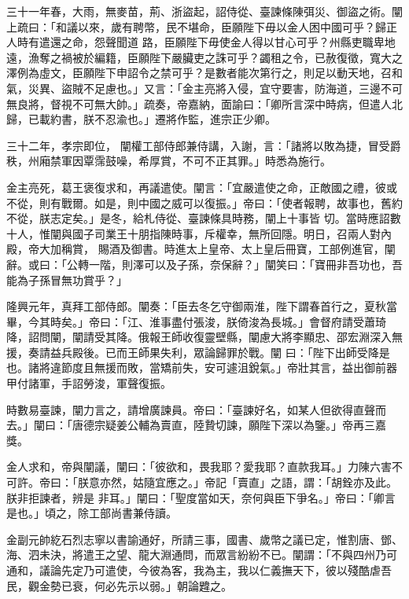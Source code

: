 \begin{pinyinscope}
 三十一年春，大雨，無麥苗，荊、浙盜起，詔侍從、臺諫條陳弭災、御盜之術。闡上疏曰：「和議以來，歲有聘幣，民不堪命，臣願陛下毋以金人困中國可乎？歸正人時有遣還之命，怨聲聞道
 路，臣願陛下毋使金人得以甘心可乎？州縣吏職卑地遠，漁奪之禍被於編籍，臣願陛下嚴臟吏之誅可乎？蠲租之令，已赦復徵，寬大之澤例為虛文，臣願陛下申詔令之禁可乎？是數者能次第行之，則足以動天地，召和氣，災異、盜賊不足慮也。」又言：「金主亮將入侵，宜守要害，防海道，三邊不可無良將，督視不可無大帥。」疏奏，帝嘉納，面諭曰：「卿所言深中時病，但遣人北歸，已載約書，朕不忍渝也。」遷將作監，進宗正少卿。



 三十二年，孝宗即位，
 闡權工部侍郎兼侍講，入謝，言：「諸將以敗為捷，冒受爵秩，州廂禁軍因覃霈鼓噪，希厚賞，不可不正其罪。」時悉為施行。


金主亮死，葛王褒復求和，再議遣使。闡言：「宜嚴遣使之命，正敵國之禮，彼或不從，則有戰爾。如是，則中國之威可以復振。」帝曰：「使者報聘，故事也，舊約不從，朕志定矣。」是冬，給札侍從、臺諫條具時務，闡上十事皆
 切。當時應詔數十人，惟闡與國子司業王十朋指陳時事，斥權幸，無所回隱。明日，召兩人對內殿，帝大加稱賞，
 賜酒及御書。時進太上皇帝、太上皇后冊寶，工部例進官，闡辭。或曰：「公轉一階，則澤可以及子孫，奈保辭？」闡笑曰：「寶冊非吾功也，吾能為子孫冒無功賞乎？」



 隆興元年，真拜工部侍郎。闡奏：「臣去冬乞守御兩淮，陛下謂春首行之，夏秋當畢，今其時矣。」帝曰：「江、淮事盡付張浚，朕倚浚為長城。」會督府請受蕭琦降，詔問闡，闡請受其降。俄報王師收復靈壁縣，闡慮大將李顯忠、邵宏淵深入無援，奏請益兵殿後。已而王師果失利，眾論歸罪於戰。闡
 曰：「陛下出師受降是也。諸將違節度且無援而敗，當矯前失，安可遽沮銳氣。」帝壯其言，益出御前器甲付諸軍，手詔勞浚，軍聲復振。



 時數易臺諫，闡力言之，請增廣諫員。帝曰：「臺諫好名，如某人但欲得直聲而去。」闡曰：「唐德宗疑姜公輔為賣直，陸贄切諫，願陛下深以為鑒。」帝再三嘉獎。



 金人求和，帝與闡議，闡曰：「彼欲和，畏我耶？愛我耶？直款我耳。」力陳六害不可許。帝曰：「朕意亦然，姑隨宜應之。」帝記「賣直」之語，謂：「胡銓亦及此。朕非拒諫者，辨是
 非耳。」闡曰：「聖度當如天，奈何與臣下爭名。」帝曰：「卿言是也。」頃之，除工部尚書兼侍讀。



 金副元帥紇石烈志寧以書諭通好，所請三事，國書、歲幣之議已定，惟割唐、鄧、海、泗未決，將遣王之望、龍大淵通問，而眾言紛紛不已。闡謂：「不與四州乃可通和，議論先定乃可遣使，今彼為客，我為主，我以仁義撫天下，彼以殘酷虐吾民，觀金勢已衰，何必先示以弱。」朝論韙之。




\end{pinyinscope}
